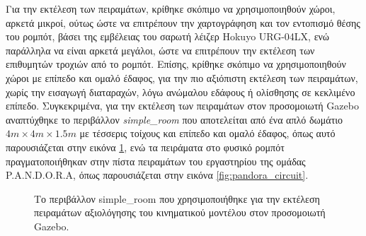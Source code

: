 \bigskip
Για την εκτέλεση των πειραμάτων, κρίθηκε σκόπιμο να χρησιμοποιηθούν χώροι, αρκετά μικροί, ούτως ώστε να επιτρέπουν την χαρτογράφηση και τον εντοπισμό θέσης του ρομπότ, βάσει της εμβέλειας του σαρωτή λέιζερ Hokuyo URG-04LX, ενώ παράλληλα να είναι αρκετά μεγάλοι, ώστε να επιτρέπουν την εκτέλεση των επιθυμητών τροχιών από το ρομπότ. Επίσης, κρίθηκε σκόπιμο να χρησιμοποιηθούν χώροι με επίπεδο και ομαλό έδαφος, για την πιο αξιόπιστη εκτέλεση των πειραμάτων, χωρίς την εισαγωγή διαταραχών, λόγω ανώμαλου εδάφους ή ολίσθησης σε κεκλιμένο επίπεδο. Συγκεκριμένα, για την εκτέλεση των πειραμάτων στον προσομοιωτή Gazebo αναπτύχθηκε το περιβάλλον \textit{simple{\_}room} που αποτελείται από ένα απλό δωμάτιο $4m \times 4m \times 1.5m$ με τέσσερις τοίχους και επίπεδο και ομαλό έδαφος, όπως αυτό παρουσιάζεται στην εικόνα \ref{fig:simple_room}, ενώ τα πειράματα στο φυσικό ρομπότ πραγματοποιήθηκαν στην πίστα πειραμάτων του εργαστηρίου της ομάδας P.A.N.D.O.R.A, όπως παρουσιάζεται στην εικόνα \ref{fig:pandora_circuit}.

\begin{figure}[!ht]
	\centering
	\caption{Το περιβάλλον simple{\_}room που χρησιμοποιήθηκε για την εκτέλεση πειραμάτων  αξιολόγησης του κινηματικού μοντέλου στον προσομοιωτή Gazebo.}
	\label{fig:simple_room}
\end{figure}

